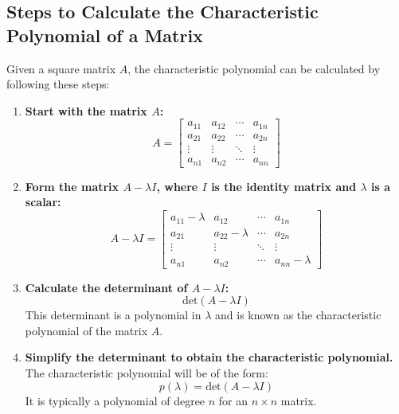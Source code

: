 \subsection{Steps to Calculate the Characteristic Polynomial of a Matrix}
\begin{process}
    Given a square matrix \( A \), the characteristic polynomial can be calculated by following these steps:

\begin{enumerate}
    \item \textbf{Start with the matrix \( A \):}
    \[
    A = \begin{bmatrix}
    a_{11} & a_{12} & \cdots & a_{1n} \\
    a_{21} & a_{22} & \cdots & a_{2n} \\
    \vdots & \vdots & \ddots & \vdots \\
    a_{n1} & a_{n2} & \cdots & a_{nn}
    \end{bmatrix}
    \]

    \item \textbf{Form the matrix \( A - \lambda I \), where \( I \) is the identity matrix and \( \lambda \) is a scalar:}
    \[
    A - \lambda I = \begin{bmatrix}
    a_{11} - \lambda & a_{12} & \cdots & a_{1n} \\
    a_{21} & a_{22} - \lambda & \cdots & a_{2n} \\
    \vdots & \vdots & \ddots & \vdots \\
    a_{n1} & a_{n2} & \cdots & a_{nn} - \lambda
    \end{bmatrix}
    \]

    \item \textbf{Calculate the determinant of \( A - \lambda I \):}
    \[
    \text{det}(A - \lambda I)
    \]
    This determinant is a polynomial in \( \lambda \) and is known as the characteristic polynomial of the matrix \( A \).

    \item \textbf{Simplify the determinant to obtain the characteristic polynomial.}
    The characteristic polynomial will be of the form:
    \[
    p(\lambda) = \text{det}(A - \lambda I)
    \]
    It is typically a polynomial of degree \( n \) for an \( n \times n \) matrix.

\end{enumerate}
\end{process}

